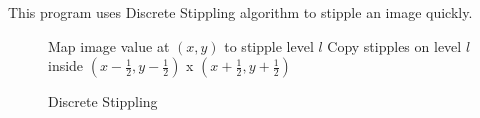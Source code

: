 \documentclass[11pt]{article}
\begin{document}
This program uses Discrete Stippling algorithm\cite{weighted-voronoi-stippling} to stipple an image quickly.

\begin{figure}[hbt]
\centering
\begin{minipage}{0.7\textwidth}

\begin{algorithm}[H]
\caption{Discrete Stippling}
\label{discretestippling}
\begin{algorithmic}

	\State Map image value at $(x, y)$ to stipple level $l$
	\State Copy stipples on level $l$ inside $(x-\frac{1}{2}, y-\frac{1}{2})$ x $(x+\frac{1}{2}, y+\frac{1}{2})$
\EndFor
\end{algorithmic}
\end{algorithm}
\end{minipage}
\end{figure}
\end{document}
